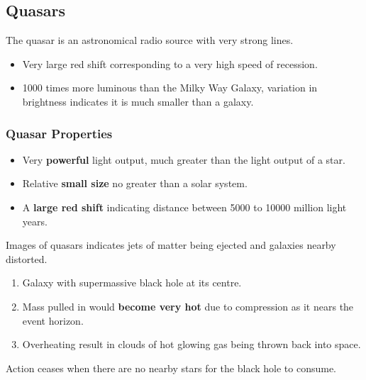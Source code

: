 \subsection{Quasars}

The quasar is an astronomical radio source with very strong lines.
\begin{itemize}
    \item Very large red shift corresponding to a very high speed of recession.
    \item 1000 times more luminous than the Milky Way Galaxy, variation in brightness indicates it is much smaller than a galaxy.
\end{itemize}

\subsubsection*{Quasar Properties}

\begin{itemize}
    \item Very \textbf{powerful} light output, much greater than the light output of a star.
    \item Relative \textbf{small size} no greater than a solar system.
    \item A \textbf{large red shift} indicating distance between 5000 to 10000 million light years.
\end{itemize}

Images of quasars indicates jets of matter being ejected and galaxies nearby distorted.
\begin{enumerate}
    \item Galaxy with supermassive black hole at its centre.
    \item Mass pulled in would \textbf{become very hot} due to compression as it nears the event horizon.
    \item Overheating result in clouds of hot glowing gas being thrown back into space.
\end{enumerate}

Action ceases when there are no nearby stars for the black hole to consume.
